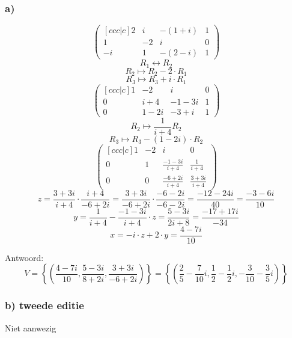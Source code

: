 \documentclass[lineaire_algebra_oplossingen.tex]{subfiles}
\begin{document}
\subsubsection*{a)}
\[
\begin{pmatrix}[ccc|c]
2 &  i &  -(1+i) & 1 \\
1 &  -2 &  i & 0 \\
-i &  1 &  -(2-i) & 1
\end{pmatrix}
\]
\[ R_1 \leftrightarrow R_2\]
\[ R_2 \longmapsto R_2 -2\cdot R_1\]
\[ R_3 \longmapsto R_3 +i\cdot R_1\]
\[
\begin{pmatrix}[ccc|c]
1 &  -2 &  i & 0 \\
0 &  i+4 &  -1-3i & 1 \\
0 &  1-2i &  -3+i & 1
\end{pmatrix}
\]
\[ R_2 \longmapsto \frac{1}{i+4} R_2 \]
\[ R_3 \longmapsto R_3 -(1-2i)\cdot R_2\]
\[
\begin{pmatrix}[ccc|c]
1 &  -2 &  i & 0 \\
0 &  1 &  \frac{-1-3i}{i+4} & \frac{1}{i+4} \\
0 &  0 &  \frac{-6+2i}{i+4} & \frac{3+3i}{i+4} 
\end{pmatrix}
\]
\[z = \frac{3+3i}{i+4}\cdot \frac{i+4}{-6+2i} = \frac{3+3i}{-6+2i}\cdot \frac{-6-2i}{-6-2i}= \frac{-12-24i}{40}= \frac{-3-6i}{10} \]
\[y = \frac{1}{i+4} - \frac{-1-3i}{i+4}\cdot z = \frac{5-3i}{2i+8} = \frac{-17+17i}{-34} \]
\[x = -i\cdot z + 2\cdot y = \frac{4-7i}{10} \]

Antwoord:
\[
V = \left\{\left( \frac{4-7i}{10} , \frac{5-3i}{8+2i} , \frac{3+3i}{-6+2i} \right)\right\} = \left\{\left( \frac{2}{5} - \frac{7}{10}i , \frac{1}{2} - \frac{1}{2}i , -\frac{3}{10} - \frac{3}{5}i \right)\right\}
\]
\subsubsection*{b) tweede editie}
Niet aanwezig
\end{document}
